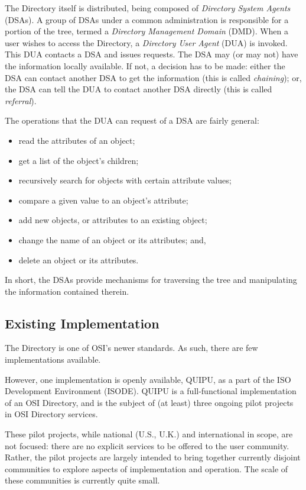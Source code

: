 The Directory itself is distributed,
being composed of {\em Directory System Agents\/} (DSAs).
A group of DSAs under a common administration is responsible for a portion of
the tree,
termed a {\em Directory Management Domain\/} (DMD).
When a user wishes to access the Directory,
a {\em Directory User Agent\/} (DUA) is invoked.
This DUA contacts a DSA and issues requests.
The DSA may (or may not) have the information locally available.
If not,
a decision has to be made:
either the DSA can contact another DSA to get the information
(this is called {\em chaining\/}); or,
the DSA can tell the DUA to contact another DSA directly
(this is called {\em referral\/}).

The operations that the DUA can request of a DSA are fairly general:
\begin{itemize}
\item	read the attributes of an object;

\item	get a list of the object's children;

\item	recursively search for objects with certain attribute values;

\item	compare a given value to an object's attribute;

\item	add new objects, or attributes to an existing object;

\item	change the name of an object or its attributes; and,

\item	delete an object or its attributes.
\end{itemize}
In short,
the DSAs provide mechanisms for traversing the tree and manipulating the
information contained therein.

\subsection	{Existing Implementation}
The Directory is one of OSI's newer standards.
As such,
there are few implementations available.

However,
one implementation is openly available,
QUIPU,
as a part of the ISO Development Environment (ISODE).
QUIPU is a full-functional implementation of an OSI Directory,
and is the subject of (at least) three ongoing pilot projects in OSI Directory
services.

These pilot projects,
while national (U.S., U.K.) and international in scope,
are not focused:
there are no explicit services to be offered to the user community.
Rather,
the pilot projects are largely intended to bring together currently disjoint
communities to explore aspects of implementation and operation.
The scale of these communities is currently quite small.

